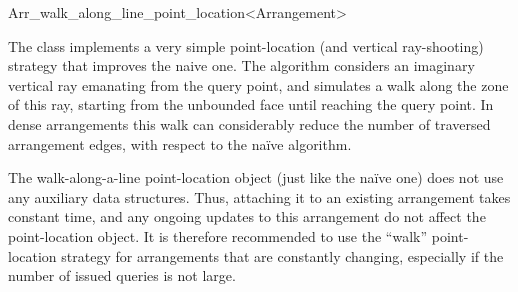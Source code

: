 
\ccRefPageBegin

\begin{ccRefClass}{Arr_walk_along_line_point_location<Arrangement>}
\label{arr_ref:walk_pl}

\ccDefinition
The \ccRefName{} class implements a very simple point-location (and 
vertical ray-shooting) strategy that improves the naive one.
The algorithm considers an imaginary vertical ray emanating from the
query point, and simulates a walk along the zone of this ray, starting
from the unbounded face until reaching the query point.
In dense arrangements this walk can considerably reduce the number
of traversed arrangement edges, with respect to the na\"{i}ve
algorithm.

The walk-along-a-line point-location object (just like the na\"{i}ve one)
does not use any auxiliary data structures. Thus, attaching it to an
existing arrangement takes constant time, and any ongoing updates to
this arrangement do not affect the point-location object.
It is therefore recommended to use the ``walk'' point-location strategy
for arrangements that are constantly changing, especially if the number
of issued queries is not large.


\ccIsModel
\\

\ccSeeAlso
\\
\\
\\

\end{ccRefClass}

\ccRefPageEnd
